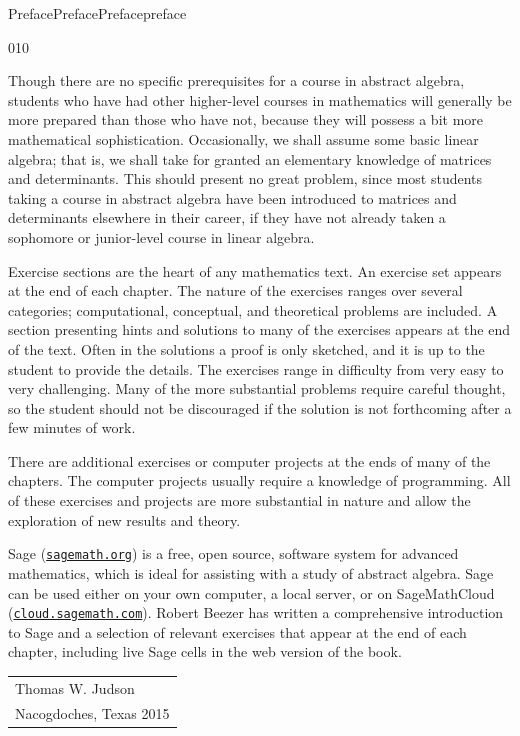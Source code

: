 \documentclass[oneside,10pt,]{book}
\numberwithin{equation}{section}
\begin{document}
\begin{preface}{Preface}{Preface}{}{Preface}{}{}{preface}
\begin{image}{0}{1}{0}{}
{%
}%
\end{image}%
Though there are no specific prerequisites for a course in abstract algebra, students who have had other higher-level courses in mathematics will generally be more prepared than those who have not, because they will possess a bit more mathematical sophistication. Occasionally, we shall assume some basic linear algebra; that is, we shall take for granted an elementary knowledge of matrices and determinants. This should present no great problem, since most students taking a course in abstract algebra have been introduced to matrices and determinants elsewhere in their career, if they have not already taken a sophomore or junior-level course in linear algebra.%
\par
Exercise sections are the heart of any mathematics text. An exercise set appears at the end of each chapter. The nature of the exercises ranges over several categories; computational,  conceptual, and theoretical problems are included. A section presenting hints and solutions to many of the exercises appears at the end of the text. Often in the solutions a proof is only sketched, and it is up to the student to provide the details. The exercises range in difficulty from very easy to very challenging. Many of the more substantial problems require careful thought, so the student should not be discouraged if the 	solution is not forthcoming after a few minutes of work.%
\par
There are additional exercises or computer projects at the ends of many of the chapters. The computer projects usually require a knowledge of programming. All of these exercises and projects are more substantial in nature and allow the exploration of new results and theory.%
\par
Sage (\href{http://sagemath.org}{\nolinkurl{sagemath.org}}) is a free, open source, software system for advanced mathematics, which is ideal for assisting with a study of abstract algebra. Sage can be used either on your own computer, a local server, or on SageMathCloud (\href{https://cloud.sagemath.com}{\nolinkurl{cloud.sagemath.com}}). Robert Beezer has written a comprehensive introduction to Sage and a selection of relevant exercises that appear at the end of each chapter, including live Sage cells in the web version of the book.%
\nopagebreak\par%
\hfill\begin{tabular}[t]{l@{}}
Thomas W. Judson\\
Nacogdoches, Texas 2015
\end{tabular}\\\par
\end{preface}
\end{document}
